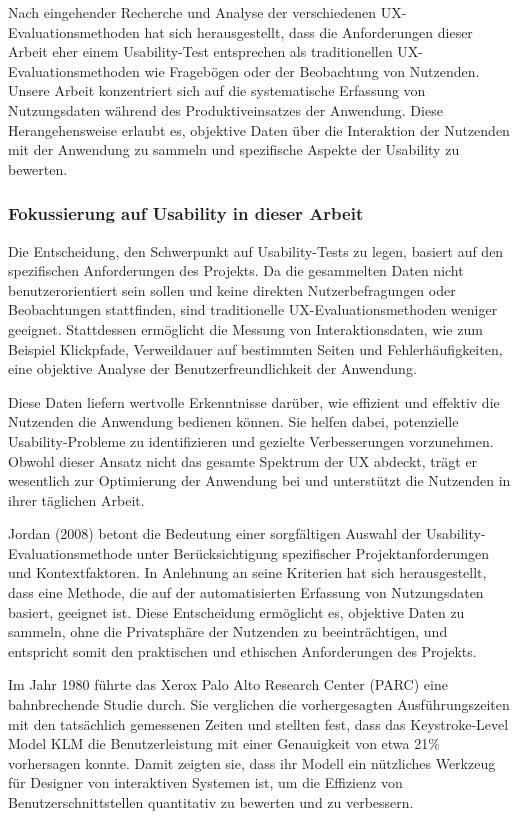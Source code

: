 \documentclass[12pt,oneside]{article}
\begin{document}
Nach eingehender Recherche und Analyse der verschiedenen UX-Evaluationsmethoden hat sich herausgestellt, dass die Anforderungen dieser Arbeit eher einem Usability-Test entsprechen als traditionellen UX-Evaluationsmethoden wie Fragebögen oder der Beobachtung von Nutzenden. Unsere Arbeit konzentriert sich auf die systematische Erfassung von Nutzungsdaten während des Produktiveinsatzes der Anwendung. Diese Herangehensweise erlaubt es, objektive Daten über die Interaktion der Nutzenden mit der Anwendung zu sammeln und spezifische Aspekte der Usability zu bewerten.
\subsubsection{Fokussierung auf Usability in dieser Arbeit}
Die Entscheidung, den Schwerpunkt auf Usability-Tests zu legen, basiert auf den spezifischen Anforderungen des Projekts. Da die gesammelten Daten nicht benutzerorientiert sein sollen und keine direkten Nutzerbefragungen oder Beobachtungen stattfinden, sind traditionelle UX-Evaluationsmethoden weniger geeignet. Stattdessen ermöglicht die Messung von Interaktionsdaten, wie zum Beispiel Klickpfade, Verweildauer auf bestimmten Seiten und Fehlerhäufigkeiten, eine objektive Analyse der Benutzerfreundlichkeit der Anwendung.


Diese Daten liefern wertvolle Erkenntnisse darüber, wie effizient und effektiv die Nutzenden die Anwendung bedienen können. Sie helfen dabei, potenzielle Usability-Probleme zu identifizieren und gezielte Verbesserungen vorzunehmen. Obwohl dieser Ansatz nicht das gesamte Spektrum der UX abdeckt, trägt er wesentlich zur Optimierung der Anwendung bei und unterstützt die Nutzenden in ihrer täglichen Arbeit.

Jordan (2008)\cite{jordan2008auswahl} betont die Bedeutung einer sorgfältigen Auswahl der Usability-Evaluationsmethode unter Berücksichtigung spezifischer Projektanforderungen und Kontextfaktoren. In Anlehnung an seine Kriterien hat sich herausgestellt, dass eine Methode, die auf der automatisierten Erfassung von Nutzungsdaten basiert, geeignet ist. Diese Entscheidung ermöglicht es, objektive Daten zu sammeln, ohne die Privatsphäre der Nutzenden zu beeinträchtigen, und entspricht somit den praktischen und ethischen Anforderungen des Projekts.

Im Jahr 1980 führte das Xerox Palo Alto Research Center (PARC)\cite{keystroke} eine bahnbrechende Studie durch. Sie verglichen die vorhergesagten Ausführungszeiten mit den tatsächlich gemessenen Zeiten und stellten fest, dass das Keystroke-Level Model  KLM die Benutzerleistung mit einer Genauigkeit von etwa 21\% vorhersagen konnte. Damit zeigten sie, dass ihr Modell ein nützliches Werkzeug für Designer von interaktiven Systemen ist, um die Effizienz von Benutzerschnittstellen quantitativ zu bewerten und zu verbessern.
\end{document}
